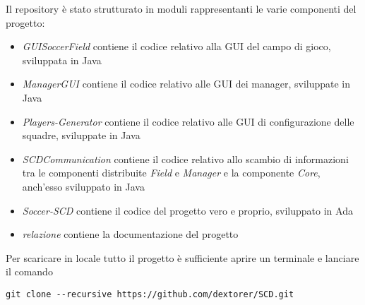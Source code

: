 Il repository è stato strutturato in moduli rappresentanti le varie componenti del progetto:
\begin{itemize}
\item \emph{GUISoccerField} contiene il codice relativo alla GUI del campo di gioco, sviluppata in Java
\item \emph{ManagerGUI} contiene il codice relativo alle GUI dei manager, sviluppate in Java
\item \emph{Players-Generator} contiene il codice relativo alle GUI di configurazione delle squadre, sviluppate in Java
\item \emph{SCDCommunication} contiene il codice relativo allo scambio di informazioni tra le componenti distribuite \emph{Field} e \emph{Manager} e la componente \emph{Core}, anch'esso sviluppato in Java
\item \emph{Soccer-SCD} contiene il codice del progetto vero e proprio, sviluppato in Ada
\item \emph{relazione} contiene la documentazione del progetto
\end{itemize} 

\noindent Per scaricare in locale tutto il progetto è sufficiente aprire un terminale e lanciare il comando\\
\begin{center}
	\verb+git clone --recursive https://github.com/dextorer/SCD.git+\\
\end{center}

